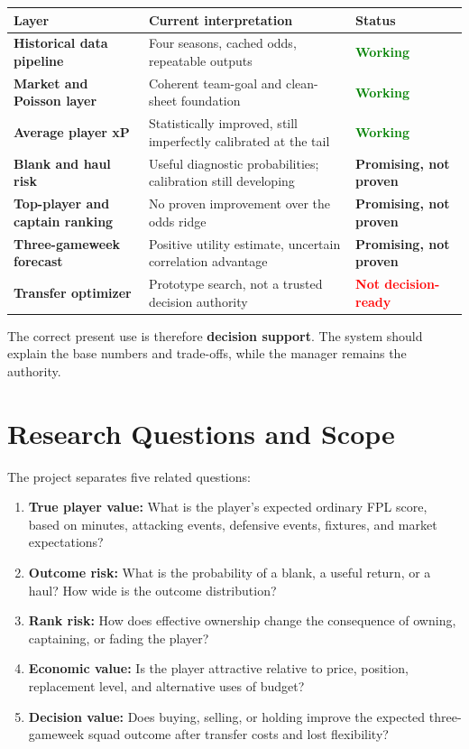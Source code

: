 \documentclass[11pt,a4paper]{article}
\newcommand{\good}{\textcolor{Green}{\textbf{Working}}}
\newcommand{\partialstat}{\textcolor{Amber}{\textbf{Promising, not proven}}}
\newcommand{\bad}{\textcolor{Red}{\textbf{Not decision-ready}}}
\begin{document}
\begin{center}
\begin{tabularx}{0.94\textwidth}{>{\bfseries}l X l}
\toprule
Layer & Current interpretation & Status\\
\midrule
Historical data pipeline & Four seasons, cached odds, repeatable outputs & \good\\
Market and Poisson layer & Coherent team-goal and clean-sheet foundation & \good\\
Average player xP & Statistically improved, still imperfectly calibrated at the tail & \good\\
Blank and haul risk & Useful diagnostic probabilities; calibration still developing & \partialstat\\
Top-player and captain ranking & No proven improvement over the odds ridge & \partialstat\\
Three-gameweek forecast & Positive utility estimate, uncertain correlation advantage & \partialstat\\
Transfer optimizer & Prototype search, not a trusted decision authority & \bad\\
\bottomrule
\end{tabularx}
\end{center}

The correct present use is therefore \textbf{decision support}. The system should explain the base numbers and trade-offs, while the manager remains the authority.

\section{Research Questions and Scope}

The project separates five related questions:

\begin{enumerate}
  \item \textbf{True player value:} What is the player's expected ordinary FPL score, based on minutes, attacking events, defensive events, fixtures, and market expectations?
  \item \textbf{Outcome risk:} What is the probability of a blank, a useful return, or a haul? How wide is the outcome distribution?
  \item \textbf{Rank risk:} How does effective ownership change the consequence of owning, captaining, or fading the player?
  \item \textbf{Economic value:} Is the player attractive relative to price, position, replacement level, and alternative uses of budget?
  \item \textbf{Decision value:} Does buying, selling, or holding improve the expected three-gameweek squad outcome after transfer costs and lost flexibility?
\end{enumerate}
\end{document}
